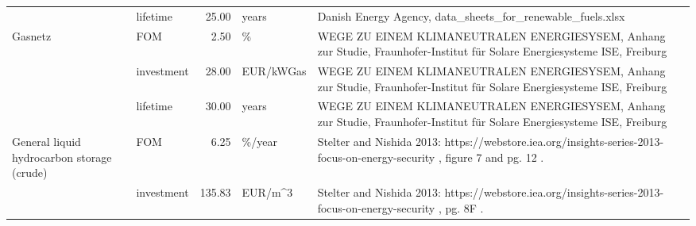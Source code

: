 \begin{longtable}{p{5cm}p{3cm}rp{3cm}p{11cm}}
                      & lifetime &          25.00 &                             years &                                                                                                                                                                                                                                                                           Danish Energy Agency, data\_sheets\_for\_renewable\_fuels.xlsx \\
Gasnetz & FOM &           2.50 &                                 \% &                                                                                                                                                                                                            WEGE ZU EINEM KLIMANEUTRALEN ENERGIESYSEM, Anhang zur Studie, Fraunhofer-Institut für Solare Energiesysteme ISE, Freiburg \\
                      & investment &          28.00 &                         EUR/kWGas &                                                                                                                                                                                                            WEGE ZU EINEM KLIMANEUTRALEN ENERGIESYSEM, Anhang zur Studie, Fraunhofer-Institut für Solare Energiesysteme ISE, Freiburg \\
                      & lifetime &          30.00 &                             years &                                                                                                                                                                                                            WEGE ZU EINEM KLIMANEUTRALEN ENERGIESYSEM, Anhang zur Studie, Fraunhofer-Institut für Solare Energiesysteme ISE, Freiburg \\
General liquid hydrocarbon storage (crude) & FOM &           6.25 &                            \%/year &                                                                                                                                                                                                             Stelter and Nishida 2013: https://webstore.iea.org/insights-series-2013-focus-on-energy-security , figure 7 and pg. 12 . \\
                      & investment &         135.83 &                           EUR/m\textasciicircum 3 &                                                                                                                                                                                                                          Stelter and Nishida 2013: https://webstore.iea.org/insights-series-2013-focus-on-energy-security , pg. 8F . \\

\end{longtable}
